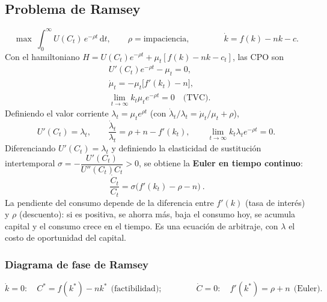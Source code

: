 \documentclass[11pt]{article}
\renewcommand{\boxed}[1]{#1}     %
\theoremstyle{definition}
\newcommand{\dd}{\,\mathrm{d}}
\begin{document}
\subsection{Problema de Ramsey}

\begin{equation}
\max\ \int_{0}^{\infty}U(C_{t})\,e^{-\rho t}\dd t,\qquad \rho=\text{impaciencia},
\qquad\qquad
\dot{k}=f(k)-nk-c .
\end{equation}
Con el hamiltoniano $H=U(C_{t})e^{-\rho t}+\mu_{t}[f(k)-nk-c_{t}]$, las CPO son
\begin{align}
&U'(C_{t})e^{-\rho t}-\mu_{t}=0, \\
&\dot{\mu}_{t}=-\mu_{t}\big[f'(k_{t})-n\big], \\
&\lim_{t\to\infty}k_{t}\mu_{t}e^{-\rho t}=0\quad\text{(TVC).}
\end{align}
Definiendo el valor corriente $\lambda_{t}=\mu_{t}e^{\rho t}$ (con
$\dot{\lambda}_{t}/\lambda_{t}=\dot{\mu}_{t}/\mu_{t}+\rho$),
\begin{equation}
U'(C_{t})=\lambda_{t},
\qquad
\frac{\dot{\lambda}_{t}}{\lambda_{t}}=\rho+n-f'(k_{t}),
\qquad
\lim_{t\to\infty}k_{t}\lambda_{t}e^{-\rho t}=0 .
\end{equation}
Diferenciando $U'(C_{t})=\lambda_{t}$ y definiendo la elasticidad de sustitución intertemporal
$\sigma=-\dfrac{U'(C_{t})}{U''(C_{t})C_{t}}>0$, se obtiene la \textbf{Euler en tiempo continuo}:
\begin{equation}
\boxed{\ \frac{\dot{C}_{t}}{C_{t}}=\sigma\big(f'(k_{t})-\rho-n\big)\ }.
\end{equation}
La pendiente del consumo depende de la diferencia entre $f'(k)$ (tasa de interés) y $\rho$
(descuento): si es positiva, se ahorra más, baja el consumo hoy, se acumula capital y el consumo
crece en el tiempo. Es una ecuación de arbitraje, con $\lambda$ el costo de oportunidad del capital.

\subsubsection{Diagrama de fase de Ramsey}
\begin{equation}
\dot{k}=0:\quad C^{\ast}=f(k^{\ast})-nk^{\ast}\ \ \text{(factibilidad)};
\qquad\qquad
\dot{C}=0:\quad f'(k^{\ast})=\rho+n\ \ \text{(Euler).}
\end{equation}
\end{document}
